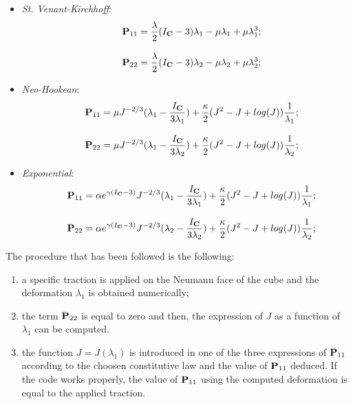 \begin{itemize}
  \item \textit{St. Venant-Kirchhoff}:
    \begin{equation}
      \begin{array}{lll}
      & \textbf{P}_{11}=\displaystyle \frac{\lambda}{2}(I_{\textbf{C}}-3)\lambda_1 - \mu\lambda_1 + \mu\lambda_1^3;\\
      \\
      & \textbf{P}_{22}=\displaystyle \frac{\lambda}{2}(I_{\textbf{C}}-3)\lambda_2 - \mu\lambda_2 + \mu\lambda_2^3;
      \end{array}
      \label{eq::P11SVK}
    \end{equation}
  \item \textit{Neo-Hookean}:
    \begin{equation}      
      \begin{array}{lll}
      & \textbf{P}_{11}=\displaystyle \mu J^{-2/3} (\lambda_1 - \frac{I_{\textbf{C}}}{3\lambda_1}) + \frac{\kappa}{2}(J^2 - J + log(J))\frac{1}{\lambda_1};\\
      \\
      & \textbf{P}_{22}=\displaystyle \mu J^{-2/3} (\lambda_1 - \frac{I_{\textbf{C}}}{3\lambda_2}) + \frac{\kappa}{2}(J^2 - J + log(J))\frac{1}{\lambda_2};
      \end{array}
      \label{eq::P11NH}
    \end{equation}
  \item \textit{Exponential}:
    \begin{equation}
      \begin{array}{lll}
      & \textbf{P}_{11}=\displaystyle \alpha e^{\gamma\left(I_{\textbf{C}}-3\right)} J^{-2/3}(\lambda_1 - \frac{I_{\textbf{C}}}{3\lambda_1})+\frac{\kappa}{2}(J^2 - J + log(J))\frac{1}{\lambda_1};\\
      \\
      & \textbf{P}_{22}=\displaystyle \alpha e^{\gamma\left(I_{\textbf{C}}-3\right)} J^{-2/3}(\lambda_2 - \frac{I_{\textbf{C}}}{3\lambda_2})+\frac{\kappa}{2}(J^2 - J + log(J))\frac{1}{\lambda_2};
      \end{array}
      \label{eq::P11EXP}
    \end{equation}
\end{itemize}
The procedure that has been followed is the following:
\begin{enumerate}
  \item a specific traction is applied on the Neumann face of the cube and the deformation $\lambda_1$ is obtained numerically; 
  \item the term $\textbf{P}_{22}$ is equal to zero and then, the expression of $J$ as a function of $\lambda_1$ can be computed.
  \item the function $J=J(\lambda_1)$ is introduced in one of the three expressions of $\textbf{P}_{11}$ according to the choosen constitutive law and the value of $\textbf{P}_{11}$ deduced. If the code works properly, the value of $\textbf{P}_{11}$ using the computed deformation is equal to the applied traction.
\end{enumerate}
